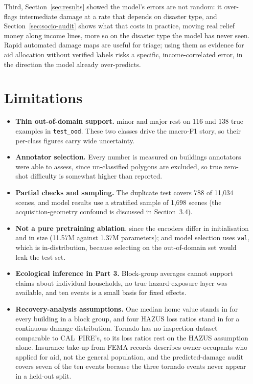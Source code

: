 \documentclass[10pt,twocolumn]{article}
\newcommand{\class}[1]{\textsf{#1}}
\begin{document}
Third, Section~\ref{sec:results} showed the model's errors are not random: it over-flags intermediate
damage at a rate that depends on disaster type, and Section~\ref{sec:socio-audit} shows what that
costs in practice, moving real relief money along income lines, more so on the disaster type the
model has never seen. Rapid automated damage maps are useful for triage; using them as evidence for
aid allocation without verified labels risks a specific, income-correlated error, in the direction the
model already over-predicts.

\section{Limitations}
\label{sec:limitations}

\begin{itemize}[leftmargin=*,itemsep=2pt,topsep=3pt]
\item \textbf{Thin out-of-domain support.} \class{minor} and \class{major} rest on 116 and 138 true
examples in \texttt{test\_ood}. These two classes drive the macro-F1 story, so their per-class figures
carry wide uncertainty.
\item \textbf{Annotator selection.} Every number is measured on buildings annotators were able
to assess, since \class{un-classified} polygons are excluded, so true zero-shot difficulty is
somewhat higher than reported.
\item \textbf{Partial checks and sampling.} The duplicate test covers 788 of 11,034 scenes, and model
results use a stratified sample of 1,698 scenes (the acquisition-geometry confound is discussed in
Section~3.4).
\item \textbf{Not a pure pretraining ablation}, since the encoders differ in initialisation and in
size (11.57M against 1.37M parameters); and model selection uses \texttt{val}, which is
in-distribution, because selecting on the out-of-domain set would leak the test set.
\item \textbf{Ecological inference in Part 3.} Block-group averages cannot support claims about
individual households, no true hazard-exposure layer was available, and ten events is a small basis
for fixed effects.
\item \textbf{Recovery-analysis assumptions.} One median home value stands in for every building in
a block group, and four HAZUS loss ratios stand in for a continuous damage distribution. Tornado has
no inspection dataset comparable to CAL~FIRE's, so its loss ratios rest on the HAZUS assumption
alone. Insurance take-up from FEMA records describes owner-occupants who applied for aid, not the
general population, and the predicted-damage audit covers seven of the ten events because the three
tornado events never appear in a held-out split.
\end{itemize}
\end{document}
